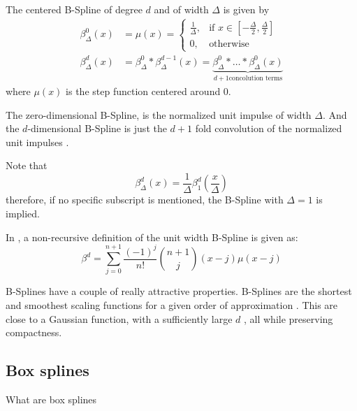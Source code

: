 \begin{definition}
    \label{def:bspline}
    The centered B-Spline of degree $d$ and of width $\Delta$ is given by
    \begin{align*}
        \beta_\Delta^0(x) &= \mu(x) =
            \begin{cases}
                \frac{1}{\Delta}, & \text{if } x \in [-\frac{\Delta}{2}, \frac{\Delta}{2}]\\
                0,           & \text{otherwise}
            \end{cases} \\
           \beta_\Delta^d(x) &= \beta_\Delta^0 * \beta_\Delta^{d-1}(x) =
               \underbrace{\beta_\Delta^0 * \dots * \beta_\Delta^0(x)}_{d+1 \text{concolution terms}}
    \end{align*}
    where $\mu(x)$ is the step function centered around 0. 

    The zero-dimensional B-Spline, is the normalized unit impulse of width $\Delta$. And the
    $d$-dimensional B-Spline is just the $d+1$ fold convolution of the normalized unit impulses
    \cite{horbelt_discretization_2002}.

    Note that
    \[ \beta_\Delta^d(x) = \frac{1}{\Delta} \beta_1^d(\frac{x}{\Delta}) \]
    therefore, if no specific subscript is mentioned, the B-Spline with $\Delta = 1$ is implied.

    In \cite{unser_fast_1991}, a non-recursive definition of the unit width B-Spline is given as:
    \[ \beta^d = \sum_{j=0}^{n+1} \frac{(-1)^j}{n!} \binom{n+1}{j}(x - j)\mu(x - j) \]
\end{definition}

B-Splines have a couple of really attractive properties. B-Splines are the shortest and smoothest
scaling functions for a given order of approximation \cite{momey_b-spline_2012}. This
are close to a Gaussian function,
with a sufficiently large $d$ \cite{momey_b-spline_2012}, all while preserving compactness.

\cite{unser_b-spline_1993}
\cite{unser_b-spline_1993-1}
\cite{unser_fast_1991}
\cite{briand_theory_2018}

\subsection{Box splines}

What are box splines

\cite{entezari_box_2012}
\cite{de_boor_box_1993}

